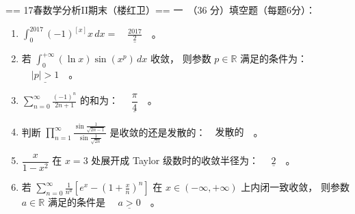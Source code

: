 == 17春数学分析II期末（楼红卫）==
一\ （36 分）填空题（每题6分）：
\begin{enumerate}[label=(\arabic*)]
\item $\displaystyle\int_{0}^{2017}(-1)^{[x]}x\,dx=\underline{\quad\frac{2017}{2}\quad}$。
\item 若 $\displaystyle\int_{0}^{+\infty}(\ln x) \sin (x^{p})\,dx$ 收敛，
则参数 $p \in \mathbb{R}$ 满足的条件为：$\underline{\quad |p|>1 \quad}$。
\item $\displaystyle\sum_{n=0}^{\infty} \frac{(-1)^{n}}{2n+1}$ 的和为：
$\underline{\quad\dfrac{\pi}{4}\quad}$。
\item 判断 $\displaystyle\prod_{n=1}^{\infty} \frac{\sin \frac{1}{\sqrt{2 n-1}}}{\sin \frac{1}{\sqrt{2n}}}$ 是收敛的还是发散的：$\underline{\quad 发散的 \quad}$。
\item $\dfrac{x}{1-x^{2}}$ 在 $x=3$ 处展开成 Taylor 级数时的收敛半径为： $\underline{\quad 2 \quad}$。
\item 若 $\displaystyle\sum_{n=0}^{\infty} \frac{1}{n^{a}}\left[e^{x}-\left(1+\frac{x}{n}\right)^{n}\right]$ 在 $x \in(-\infty,+\infty)$ 上内闭一致收敛，
则参数 $a \in \mathbb{R}$ 满足的条件是 $\underline{\quad a>0\quad}$。
\end{enumerate}
